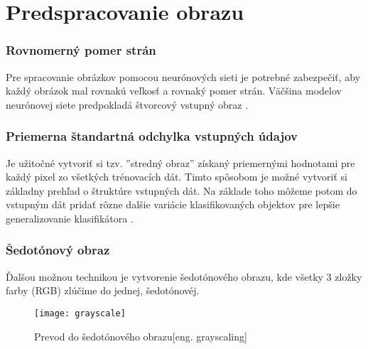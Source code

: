 
\section{Predspracovanie obrazu}



\subsubsection{Rovnomerný pomer strán}
Pre spracovanie obrázkov pomocou neurónových sieti je potrebné zabezpečiť, aby každý obrázok mal rovnakú veľkosť a rovnaký pomer strán.
Väčšina modelov neurónovej siete predpokladá štvorcový vstupný obraz \cite{odkaz:NNPreprocessing}.

\subsubsection{Priemerna štandartná odchylka vstupných údajov}
Je užitočné vytvoriť si tzv. ''stredný obraz'' získaný priemernými hodnotami pre každý pixel zo všetkých trénovacích dát.
Timto spôsobom je možné vytvoriť si základny prehľad o štruktúre vstupných dát.
Na základe toho môžeme potom do vstupným dát pridať rôzne dalšie variácie klasifikovaných objektov pre lepšie generalizovanie klasifikátora \cite{odkaz:NNPreprocessing}.

\subsubsection{Šedotónový obraz}
Ďalšou možnou technikou je vytvorenie šedotónového obrazu, kde všetky 3 zložky farby (RGB) zlúčime do jednej, šedotónovéj.
\begin{figure}[H]
	\centering
	\texttt{[image: grayscale]}
	\caption{Prevod do šedotónového obrazu[eng. grayscaling]\cite{odkaz:NNPreprocessing}}
	\label{pic:GrayScaling}
\end{figure}

